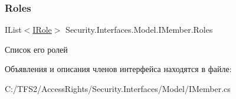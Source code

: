 \subsubsection{\texorpdfstring{Roles}{Roles}}
{\footnotesize\ttfamily I\+List$<$\hyperlink{interface_security_1_1_interfaces_1_1_model_1_1_i_role}{I\+Role}$>$ Security.\+Interfaces.\+Model.\+I\+Member.\+Roles\hspace{0.3cm}{\ttfamily [get]}}



Список его ролей 



Объявления и описания членов интерфейса находятся в файле\+:\begin{DoxyCompactItemize}
\item 
C\+:/\+T\+F\+S2/\+Access\+Rights/\+Security.\+Interfaces/\+Model/I\+Member.\+cs\end{DoxyCompactItemize}
